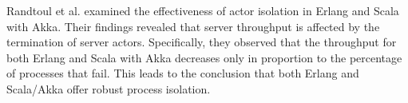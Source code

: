 Randtoul et al. \cite{Randtoul2022} examined the effectiveness of actor isolation in Erlang and Scala with Akka. Their findings revealed that server throughput is affected by the termination of server actors. Specifically, they observed that the throughput for both Erlang and Scala with Akka decreases only in proportion to the percentage of processes that fail. This leads to the conclusion that both Erlang and Scala/Akka offer robust process isolation.

